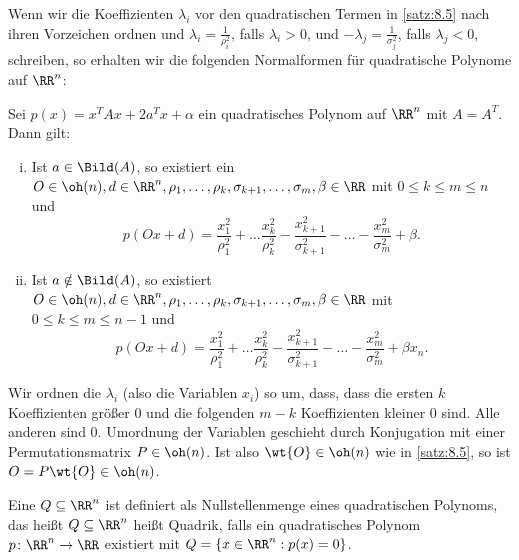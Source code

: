 Wenn wir die Koeffizienten $\lambda_i$ vor den quadratischen Termen in \autoref{satz:8.5} nach ihren Vorzeichen ordnen und $\lambda_i = \frac{1}{\rho_i^2}$, falls $\lambda_i > 0$, und $-\lambda_j = \frac{1}{\sigma_j^2}$, falls $\lambda_j < 0$, schreiben, so erhalten wir die folgenden Normalformen für quadratische Polynome auf $\RR^n$:

\begin{satz}
	\label{satz:8.6}
	Sei $p(x) = x^TAx + 2a^Tx + \alpha$ ein quadratisches Polynom auf $\RR^n$ mit $A = A^T$.
	Dann gilt:
	\begin{enumerate}[(i)]
		\item Ist $a \in \Bild(A)$, so existiert ein $O \in \oh(n), d \in \RR^n, \rho_1, \dots, \rho_k, \sigma_{k+1},\dots,\sigma_{m}, \beta \in \RR$ mit $0 \leq k \leq m \leq n$ und
		\[
			p(Ox+d) = \frac{x_1^2}{\rho_1^2} + \dots \frac{x_k^2}{\rho_k^2} - \frac{x_{k+1}^2}{\sigma_{k+1}^2} - \dots - \frac{x_m^2}{\sigma_m^2} + \beta.
		\]
		\item Ist $a \notin \Bild(A)$, so existiert $O \in \oh(n), d \in \RR^n, \rho_1, \dots, \rho_k, \sigma_{k+1},\dots,\sigma_m,\beta \in \RR$ mit $0 \leq k \leq m \leq n-1$ und
		\[
		p(Ox+d) = \frac{x_1^2}{\rho_1^2} + \dots \frac{x_k^2}{\rho_k^2} - \frac{x_{k+1}^2}{\sigma_{k+1}^2} - \dots - \frac{x_m^2}{\sigma_m^2} + \beta x_n.
		\]
	\end{enumerate}
\end{satz}

\begin{beweis}
	Wir ordnen die $\lambda_i$ (also die Variablen $x_i$) so um, dass, dass die ersten $k$ Koeffizienten größer $0$ und die folgenden $m-k$ Koeffizienten kleiner $0$ sind.
	Alle anderen sind $0$.
	Umordnung der Variablen geschieht durch Konjugation mit einer Permutationsmatrix $P \in \oh(n)$.
	Ist also $\wt{O} \in \oh(n)$ wie in \autoref{satz:8.5}, so ist $O = P\wt{O} \in \oh(n)$. 
\end{beweis}
\newpage
\begin{definition}[Quadrik]
	\label{def:8.7}
	Eine  $Q \subseteq \RR^n$ ist definiert als Nullstellenmenge eines quadratischen Polynoms, das heißt $Q \subseteq \RR^n$ heißt Quadrik, falls ein quadratisches Polynom $p \colon \RR^n \rightarrow \RR$ existiert mit $Q = \{x \in \RR^n : p(x) = 0\}$.
\end{definition}

